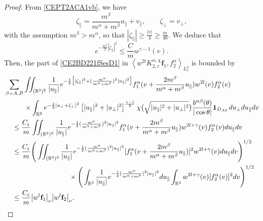 \documentclass[reqno]{amsart}
\numberwithin{equation}{section}
\numberwithin{equation}{section}
\begin{document}
\begin{proof}
		From \eqref{CEPT2ACA1vb}, we have 
		\begin{equation}\label{CET2zetabds}
			\zeta_{\parallel}=\frac{m^\beta}{m^\alpha+m^\beta}u_{\parallel}+v_\parallel, \qquad \zeta_\perp=v_\perp,
		\end{equation}
		with the assumption $m^{\beta} >m^{\alpha}$, so that $|\zeta_{\parallel}|\geq\frac{|v|}{4}\geq\frac{m}{40}$. We deduce that
		\begin{equation}\label{LifA3}
			e^{-\frac{m^\beta}{2}|\zeta_{\parallel}|^2}\leq \frac{C}{m}w^{\gamma-1} (v).
		\end{equation}
		Then, the part of \eqref{CE2BD221fSesD1} in $\left \langle  w^{2l}K_{2,r}^{\alpha,\chi}\mathbf{f}_1,f^{\alpha}_2\right \rangle_{L^{2}_{v}}$ is bounded by 
		\begin{align*}
			& \sum_{\beta=A,B}\iint_{(\mathbb{R}^3)^2} \frac{1}{|u_{\parallel}|} e^{-\frac{1}{2}\big[|\zeta_{\parallel}|^2+(\frac{m^\alpha}{m^\alpha+m^\beta})^2|u_{\parallel}|^2\big]} f^\alpha_1(v + \frac{2m^{\beta}}{m^{\alpha}+m^{\beta}}u_{\parallel}) w^{2l}(v)f^\alpha_2(v)\\
			&\hspace{1cm} \times \int_{\mathbb{R}^2} e^{-\frac{1}{2}|u_{\perp} + \zeta_{\perp}|^2} \left[|u_{\parallel}|^2 + |u_{\perp}|^2\right]^{\frac{\gamma - 1}{2}} \chi\big(\sqrt{|u_{\parallel}|^2 + |u_{\perp}|^2}\big) \frac{b^{ \alpha \beta}(\theta)}{|\cos \theta|}\mathbf{1}_{D_{A3}} \, du_{\perp} du_{\parallel}dv\\
			&\hspace{0.4cm}\leq \frac{C_\varepsilon}{m} \iint_{(\mathbb{R}^3)^2}\frac{1}{|u_{\parallel}|}e^{-\frac{1}{2}(\frac{m^\alpha}{m^\alpha+m^\beta})^2|u_{\parallel}|^2}f^\alpha_1(v + \frac{2m^{\beta}}{m^{\alpha}+m^{\beta}}u_{\parallel}) w^{2l+\gamma}(v)f^\alpha_2(v)du_{\parallel}dv\\
			&\hspace{0.4cm}\leq \frac{C_\varepsilon}{m} \Bigg(\iint_{(\mathbb{R}^3)^2}\frac{1}{|u_{\parallel}|}e^{-\frac{1}{2}(\frac{m^\alpha}{m^\alpha+m^\beta})^2|u_{\parallel}|^2}[f^\alpha_1(v + \frac{2m^{\beta}}{m^{\alpha}+m^{\beta}}u_{\parallel})]^{2} w^{2l+\gamma}(v)du_{\parallel}dv\Bigg)^{1/2}\\
			&\hspace{3.3cm}\times  \Bigg(\int_{\mathbb{R}^3}\frac{1}{|u_{\parallel}|}e^{-\frac{1}{2}(\frac{m^\alpha}{m^\alpha+m^\beta})^2|u_{\parallel}|^2} du_{\parallel}\int_{\mathbb{R}^3}w^{2l+\gamma}(v)[f^\alpha_2(v)]^2dv\Bigg)^{1/2}\notag\\
			&\hspace{0.4cm}\leq \frac{C_\varepsilon}{m} \big|w^{l}\mathbf{f}_1\big|_\nu \big|w^{l} \mathbf{f}_2\big|_\nu.
		\end{align*}
		


\end{proof}
\end{document}
